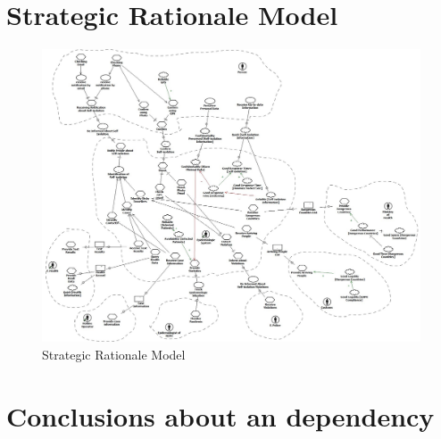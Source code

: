 \documentclass{VUMIFPSkursinis}
\begin{document}
\section{Strategic Rationale Model}
\begin{figure}[H]
    \center
    \includegraphics[scale=0.3]{StarUML/Strategic_Rationale.jpg}
    \caption{Strategic Rationale Model} %
    \label{img:strategicRationale}
\end{figure}
\section{Conclusions about an dependency}
	
\end{document}
